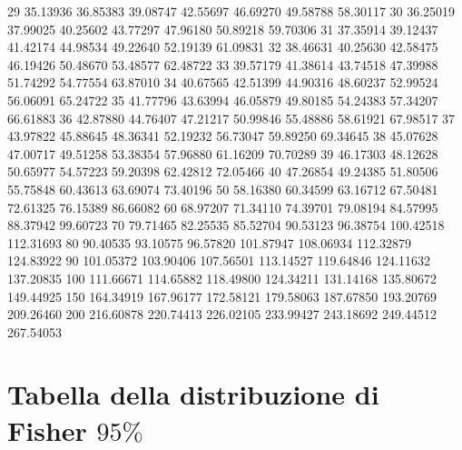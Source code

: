 \documentclass[onecolumn,11pt]{book}
\begin{document}
\begin{Schunk}
\begin{Soutput}
29   35.13936  36.85383  39.08747  42.55697  46.69270  49.58788  58.30117
30   36.25019  37.99025  40.25602  43.77297  47.96180  50.89218  59.70306
31   37.35914  39.12437  41.42174  44.98534  49.22640  52.19139  61.09831
32   38.46631  40.25630  42.58475  46.19426  50.48670  53.48577  62.48722
33   39.57179  41.38614  43.74518  47.39988  51.74292  54.77554  63.87010
34   40.67565  42.51399  44.90316  48.60237  52.99524  56.06091  65.24722
35   41.77796  43.63994  46.05879  49.80185  54.24383  57.34207  66.61883
36   42.87880  44.76407  47.21217  50.99846  55.48886  58.61921  67.98517
37   43.97822  45.88645  48.36341  52.19232  56.73047  59.89250  69.34645
38   45.07628  47.00717  49.51258  53.38354  57.96880  61.16209  70.70289
39   46.17303  48.12628  50.65977  54.57223  59.20398  62.42812  72.05466
40   47.26854  49.24385  51.80506  55.75848  60.43613  63.69074  73.40196
50   58.16380  60.34599  63.16712  67.50481  72.61325  76.15389  86.66082
60   68.97207  71.34110  74.39701  79.08194  84.57995  88.37942  99.60723
70   79.71465  82.25535  85.52704  90.53123  96.38754 100.42518 112.31693
80   90.40535  93.10575  96.57820 101.87947 108.06934 112.32879 124.83922
90  101.05372 103.90406 107.56501 113.14527 119.64846 124.11632 137.20835
100 111.66671 114.65882 118.49800 124.34211 131.14168 135.80672 149.44925
150 164.34919 167.96177 172.58121 179.58063 187.67850 193.20769 209.26460
200 216.60878 220.74413 226.02105 233.99427 243.18692 249.44512 267.54053
\end{Soutput}
\end{Schunk}
\normalsize\section*{Tabella della distribuzione di Fisher $95\%$}
\oddsidemargin 0.0in
\evensidemargin 0.0in
\topmargin -0.4in
\small
\end{document}

